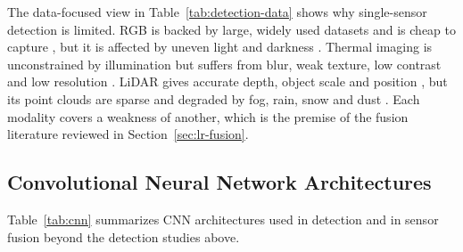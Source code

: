 The data-focused view in Table~\ref{tab:detection-data} shows why single-sensor
detection is limited. RGB is backed by large, widely used datasets
\citep{Zhang2024,Srivastava2021} and is cheap to capture \citep{Suzuki2026}, but it is affected by uneven light and darkness \citep{Zhang2024,Lalitha2022,Wu2023,Wu2026}.
Thermal imaging is unconstrained by illumination \citep{Liu2026c,Wen2025} but suffers from
blur, weak texture, low contrast and low resolution \citep{Liu2026c,Wang2024b,Wen2025}. LiDAR gives
accurate depth, object scale and position \citep{Naich2024,Prasanth2026,Soumya2026}, but its point clouds
are sparse \citep{Prasanth2026} and degraded by fog, rain, snow and dust \citep{Naich2024,Soumya2026}. Each
modality covers a weakness of another, which is the premise of the fusion
literature reviewed in Section~\ref{sec:lr-fusion}.

\subsection{Convolutional Neural Network Architectures}

Table~\ref{tab:cnn} summarizes CNN architectures used in detection and in
sensor fusion beyond the detection studies above.

